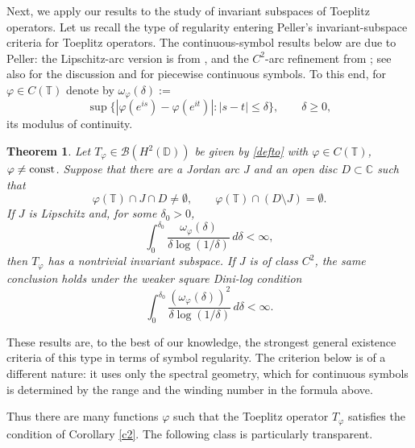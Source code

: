 \documentclass[11pt]{amsart}
\numberwithin{equation}{section}
\newtheorem{theorem}{Theorem}[section]
\theoremstyle{definition}
\theoremstyle{remark}
\newcommand{\CC}{\mathbb{C}}
\begin{document}
Next, we apply our results to the study of invariant subspaces of Toeplitz operators.
Let us recall the type of regularity entering Peller's invariant-subspace criteria for Toeplitz operators. The continuous-symbol results below are due to Peller: the Lipschitz-arc version is from \cite{PellerToeplitz83}, and the $C^2$-arc refinement from \cite{PellerToeplitz87}; see also \cite{PellerToeplitz} for the discussion and for piecewise continuous symbols. To this end, for $\varphi \in C(\mathbb T)$ denote by  $\omega_\varphi(\delta):=$
$$
 \sup\{|\varphi(e^{is})-\varphi(e^{it})|:|s-t|\le\delta\}, \qquad \delta \ge 0,
$$
 its modulus of continuity.
\begin{theorem}
Let $T_\varphi \in \mathcal B(H^2(\mathbb D))$ be given by \eqref{defto} with 
$\varphi \in C(\mathbb T)$, $\varphi\ne {\rm const}$. Suppose that there are a Jordan arc $J$ and an open disc $D\subset\CC$ such that
$$
        \varphi(\mathbb T)\cap J\cap D\ne\emptyset,
        \qquad
        \varphi(\mathbb T)\cap(D\setminus J)=\emptyset.
$$
If $J$ is Lipschitz and, for some $\delta_0>0$,
$$
        \int_0^{\delta_0}
        \frac{\omega_\varphi(\delta)}
             {\delta\log(1/\delta)}\,d\delta<\infty,
$$
then $T_\varphi$ has a nontrivial invariant subspace. If $J$ is of class $C^2$, the same conclusion holds under the weaker square Dini-log condition
\begin{equation}\label{dini_log}
        \int_0^{\delta_0}
        \frac{(\omega_\varphi(\delta))^2}
             {\delta\log(1/\delta)}\,d\delta<\infty.
\end{equation}
\end{theorem}
These results are, to the best of our knowledge, the strongest general existence criteria of this type in terms of symbol regularity. The criterion below is of a different nature: it uses only the spectral geometry, which for continuous symbols is determined by the range and the winding number in the formula above.

Thus there are many functions $\varphi$ such that the Toeplitz operator $T_\varphi$ satisfies the condition of Corollary \ref{c2}. The following class is particularly transparent.
\end{document}

